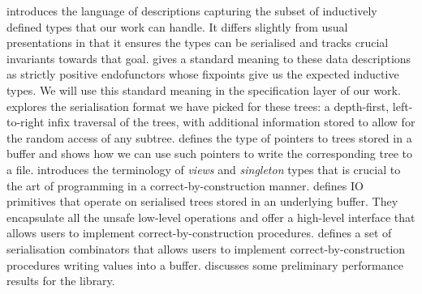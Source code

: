  introduces the language of descriptions capturing the
subset of inductively defined types that our work can handle.
It differs slightly from usual presentations in that it ensures the
types can be serialised and tracks crucial invariants towards that goal.
%
 gives a standard meaning to these data descriptions
as strictly positive endofunctors whose fixpoints give us the expected
inductive types.
%
We will use this standard meaning in the specification layer of our work.
%
 explores the serialisation format we have picked
for these trees: a depth-first, left-to-right infix traversal of the
trees, with additional information stored to allow for the random access
of any subtree.
%
 defines the type of pointers to trees stored in a
buffer and shows how we can use such pointers to write the corresponding
tree to a file.
%
 introduces the terminology of \emph{views} and
\emph{singleton} types that is crucial to the art of programming
in a correct-by-construction manner.
%
 defines IO primitives that operate on serialised
trees stored in an underlying buffer.
%
They encapsulate all the unsafe low-level operations and offer a
high-level interface that allows users to implement correct-by-construction
procedures.
%
 defines a set of serialisation combinators that
allows users to implement correct-by-construction procedures writing
values into a buffer.
%
 discusses some preliminary performance results for
the library.
